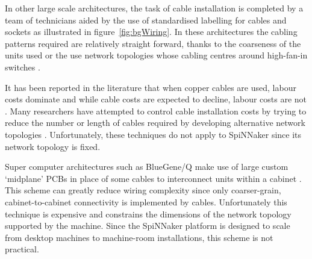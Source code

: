 			In other large scale architectures, the task of cable installation is
			completed by a team of technicians aided by the use of standardised
			labelling for cables and sockets \cite{tia2006} as illustrated in
			figure~\ref{fig:bgWiring}. In these architectures the cabling patterns
			required are relatively straight forward, thanks to the coarseness of the
			units used \cite{lakner07} or the use network topologies whose cabling
			centres around high-fan-in switches \cite{cisco07,csernai15}.
			
			It has been reported in the literature that when copper cables are used,
			labour costs dominate \cite{popa10} and while cable costs are expected to
			decline, labour costs are not \cite{mudigonda11}. Many researchers have
			attempted to control cable installation costs by trying to reduce the
			number or length of cables required by developing alternative network
			topologies \cite{curtis12, popa10, mudigonda11}.  Unfortunately, these
			techniques do not apply to SpiNNaker since its network topology is fixed.
			
			Super computer architectures such as BlueGene/Q make use of large custom
			`midplane' PCBs in place of some cables to interconnect units within a
			cabinet \cite{prickett10}. This scheme can greatly reduce wiring
			complexity since only coarser-grain, cabinet-to-cabinet connectivity is
			implemented by cables. Unfortunately this technique is expensive and
			constrains the dimensions of the network topology supported by the
			machine. Since the SpiNNaker platform is designed to scale from desktop
			machines to machine-room installations, this scheme is not practical.
			

